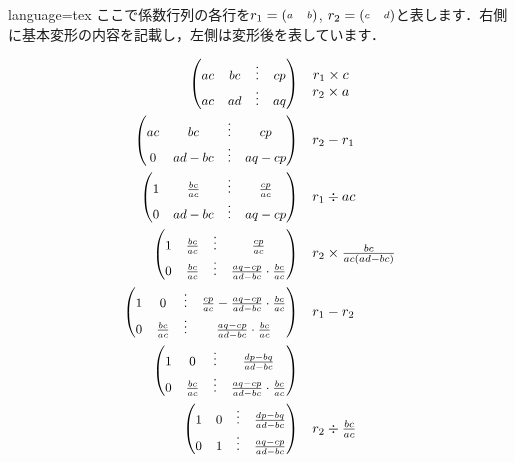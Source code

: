 \documentclass[../main]{subfiles}
\begin{document}
\begin{Code}{language=tex}
ここで係数行列の各行を$r_1 = {\scriptsize\begin{pmatrix}a&b\end{pmatrix}}$, $r_2 = {\scriptsize\begin{pmatrix}c&d\end{pmatrix}}$と表します．右側に基本変形の内容を記載し，左側は変形後を表しています．

\begin{align}
    \PMat{ac&bc&\vdots&cp\\ac&ad&\vdots&aq} &
    \quad \begin{matrix}
        r_1\times c\\r_2\times a
    \end{matrix} \\
    \PMat{ac&bc&\vdots&cp\\0&ad-bc&\vdots&aq-cp} &
    \quad \begin{matrix}
        r_2-r_1
    \end{matrix} \\
    \PMat{1&\frac{bc}{ac}&\vdots&\frac{cp}{ac}\\0&ad-bc&\vdots&aq-cp} &
    \quad \begin{matrix}
        r_1\div ac
    \end{matrix} \\
    \PMat{1&\frac{bc}{ac}&\vdots&\frac{cp}{ac}\\0&\frac{bc}{ac}&\vdots&\frac{aq-cp}{ad-bc}\cdot\frac{bc}{ac}} &
    \quad \begin{matrix}
        r_2\times \frac{bc}{ac(ad-bc)}
    \end{matrix} \\
    \PMat{1&0&\vdots&\frac{cp}{ac}-\frac{aq-cp}{ad-bc}\cdot\frac{bc}{ac}\\0&\frac{bc}{ac}&\vdots&\frac{aq-cp}{ad-bc}\cdot\frac{bc}{ac}} &
    \quad \begin{matrix}
        r_1-r_2
    \end{matrix} \\
    \PMat{1&0&\vdots&\frac{dp-bq}{ad-bc}\\0&\frac{bc}{ac}&\vdots&\frac{aq-cp}{ad-bc}\cdot\frac{bc}{ac}} &
    \quad \begin{matrix}
    \end{matrix} \\
    \PMat{1&0&\vdots&\frac{dp-bq}{ad-bc}\\0&1&\vdots&\frac{aq-cp}{ad-bc}} &
    \quad \begin{matrix}
        r_2\div \frac{bc}{ac}
    \end{matrix}
\end{align}
\end{Code}
\end{document}
